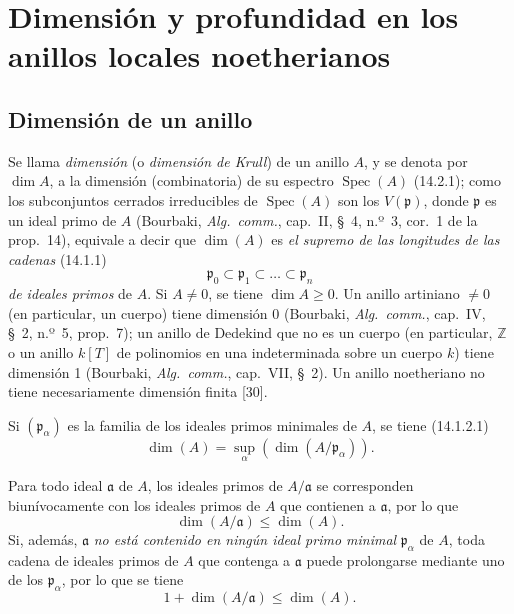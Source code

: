 \section{Dimensión y profundidad en los anillos locales noetherianos}
\label{section:0.16-es}

\subsection{Dimensión de un anillo}
\label{subsection:0.16.1-es}

\begin{env}[16.1.1]
\label{0.16.1.1-es}
Se llama \emph{dimensión} (o \emph{dimensión de Krull}) de un anillo $A$, y se denota por
$\dim A$, a la dimensión (combinatoria) de su espectro
$\operatorname{Spec}(A)$ (14.2.1); como los subconjuntos cerrados irreducibles
de $\operatorname{Spec}(A)$ son los
$V(\mathfrak{p})$, donde $\mathfrak{p}$ es un ideal primo de $A$ (Bourbaki,
\emph{Alg.~comm.}, cap.~II, \S~4, n.º~3, cor.~1 de la prop.~14), equivale a
decir que $\dim(A)$ es \emph{el supremo de las longitudes de las cadenas} (14.1.1)
\[
  \mathfrak{p}_0\subset\mathfrak{p}_1\subset\ldots\subset\mathfrak{p}_n
\]
\emph{de ideales primos} de $A$. Si $A\neq0$, se tiene $\dim A\geq0$. Un anillo
artiniano $\neq0$ (en particular, un cuerpo) tiene dimensión 0 (Bourbaki,
\emph{Alg.~comm.}, cap.~IV, \S~2, n.º~5, prop.~7); un anillo de Dedekind que
no es un cuerpo (en particular, $\mathbb{Z}$ o un anillo $k[T]$ de polinomios
en una indeterminada sobre un cuerpo $k$) tiene dimensión 1 (Bourbaki,
\emph{Alg.~comm.}, cap.~VII, \S~2). Un anillo noetheriano no tiene
necesariamente dimensión finita [30].

Si $(\mathfrak{p}_\alpha)$ es la familia de los ideales primos minimales de
$A$, se tiene (14.1.2.1)
\[
\label{0.16.1.1.1-es}
  \dim(A)=\sup_\alpha(\dim(A/\mathfrak{p}_\alpha)).
\tag{16.1.1.1}
\]
\end{env}

\begin{env}[16.1.2]
\label{0.16.1.2-es}
Para todo ideal $\mathfrak{a}$ de $A$, los ideales primos de
$A/\mathfrak{a}$ se corresponden biunívocamente con los ideales primos de $A$
que contienen a $\mathfrak{a}$, por lo que
\[
\label{0.16.1.2.1-es}
  \dim(A/\mathfrak{a})\leq\dim(A).
\tag{16.1.2.1}
\]
Si, además, $\mathfrak{a}$ \emph{no está contenido en ningún ideal primo minimal}
$\mathfrak{p}_\alpha$ de $A$, toda cadena de ideales primos de $A$ que
contenga a $\mathfrak{a}$ puede prolongarse mediante uno de los
$\mathfrak{p}_\alpha$, por lo que se tiene
\[
\label{0.16.1.2.2-es}
  1+\dim(A/\mathfrak{a})\leq\dim(A).
\tag{16.1.2.2}
\]
\end{env}

